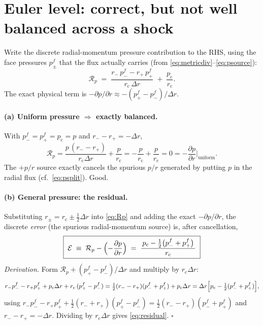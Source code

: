 \documentclass[11pt]{article}
\newcommand{\pd}[2]{\frac{\partial #1}{\partial #2}}
\newcommand{\rhalf}{r_{\mathrm{c}}}
\begin{document}
\section{Euler level: correct, but not well balanced across a shock}
\label{sec:euler}
Write the discrete radial-momentum pressure contribution to the RHS,
using the face pressures $p^{f}_{\pm}$ that the flux actually carries
(from \eqref{eq:metricdiv}--\eqref{eq:psource}):
\begin{equation}
\mathcal R_p \;=\; \frac{r_-\,p^{f}_- - r_+\,p^{f}_+}{\rhalf\,\Delta r}
                 \;+\; \frac{p_{\mathrm c}}{\rhalf}.
\label{eq:Rp}
\end{equation}
The exact physical term is $-\partial p/\partial r \approx
-(p^{f}_+-p^{f}_-)/\Delta r$.

\paragraph{(a) Uniform pressure $\Rightarrow$ exactly balanced.}
With $p^{f}_-=p^{f}_+=p_{\mathrm c}=p$ and $r_--r_+=-\Delta r$,
\begin{equation}
\mathcal R_p = \frac{p\,(r_--r_+)}{\rhalf\Delta r} + \frac{p}{\rhalf}
             = -\frac{p}{\rhalf} + \frac{p}{\rhalf} = 0
             = -\pd{p}{r}\Big|_{\text{uniform}} .
\end{equation}
The $+p/r$ source exactly cancels the spurious $p/r$ generated by putting
$p$ in the radial flux (cf.\ \eqref{eq:psplit}).  Good.

\paragraph{(b) General pressure: the residual.}
Substituting $r_\pm=\rhalf\pm\tfrac12\Delta r$ into \eqref{eq:Rp} and
adding the exact $-\partial p/\partial r$, the discrete \emph{error}
(the spurious radial-momentum source) is, after cancellation,
\begin{equation}
\boxed{\;
\mathcal E \;\equiv\; \mathcal R_p - \Bigl(-\pd{p}{r}\Bigr)
   \;=\; \frac{\,p_{\mathrm c}-\tfrac12\bigl(p^{f}_-+p^{f}_+\bigr)\,}{\rhalf}\;}
\label{eq:residual}
\end{equation}
\emph{Derivation.}  Form $\mathcal R_p+(p^{f}_+-p^{f}_-)/\Delta r$ and
multiply by $\rhalf\Delta r$:
\[
r_-p^{f}_- - r_+p^{f}_+ + p_{\mathrm c}\Delta r + \rhalf\,(p^{f}_+-p^{f}_-)
= \tfrac12(r_--r_+)(p^{f}_-+p^{f}_+) + p_{\mathrm c}\Delta r
= \Delta r\Bigl[p_{\mathrm c}-\tfrac12(p^{f}_-+p^{f}_+)\Bigr],
\]
using $r_-p^{f}_- - r_+p^{f}_+ + \tfrac12(r_-+r_+)(p^{f}_+-p^{f}_-)
=\tfrac12(r_--r_+)(p^{f}_-+p^{f}_+)$ and $r_--r_+=-\Delta r$.  Dividing by
$\rhalf\Delta r$ gives \eqref{eq:residual}. \hfill$\square$
\end{document}

